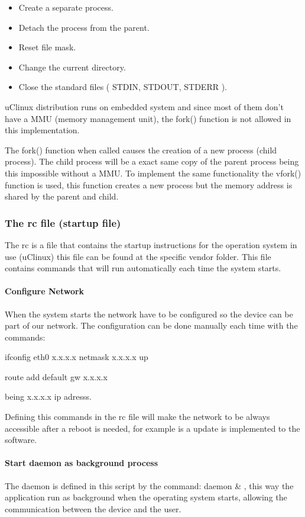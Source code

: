 \begin{itemize}
	\item Create a separate process.
	\item Detach the process from the parent.
	\item Reset file mask.
	\item Change the current directory.
	\item Close the standard files ( STDIN, STDOUT, STDERR ).
\end{itemize}

uClinux distribution runs on embedded system and since most of them don't have a MMU (memory management unit), the fork() function is not allowed in this implementation.

The fork() function when called causes the creation of a new process (child process). The child process will be a exact same copy of the parent process being this impossible without a MMU.
To implement the same functionality the vfork() function is used, this function creates a new process but the memory address is shared by the parent and child.

\subsubsection{The rc file (startup file)}
The rc is a file that contains the startup instructions for the operation system in use (uClinux) this file can be found at the specific vendor folder. 
This file contains commands that will run automatically each time the system starts.
\paragraph{Configure Network}
When the system starts the network have to be configured so the device can be part of our network. The configuration can be done manually each time with the commands:

ifconfig eth0 x.x.x.x netmask x.x.x.x up

route add default gw x.x.x.x

being x.x.x.x ip adresss.

Defining this commands in the rc file will make the network to be always accessible after a reboot is needed, for example is a update is implemented to the software. 

\paragraph{Start daemon as background process}
The daemon is defined in this script by the command: daemon \& , this way the application run as background when the operating system starts, allowing the communication between the device and the user.

